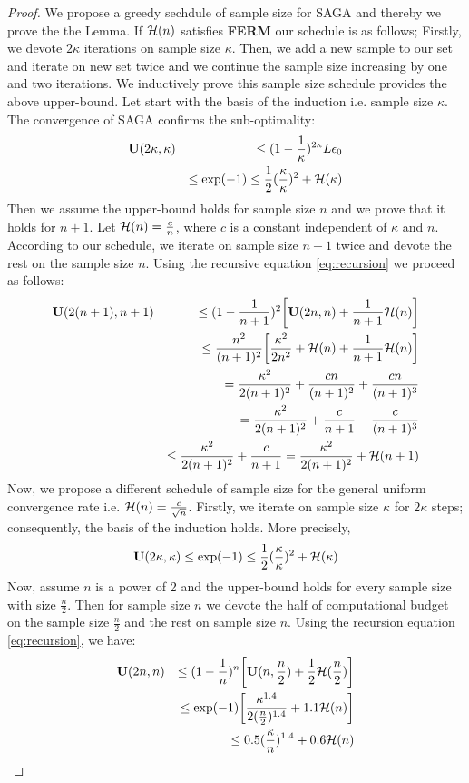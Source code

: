 \documentclass{article}
\begin{document}
\begin{proof}
	We propose a greedy sechdule of sample size for SAGA and thereby we prove the
	the Lemma. If ${\cal H}(n)$ satisfies \textbf{FERM} our schedule is as follows;
	Firstly, we devote $2 \kappa$ iterations on sample size $\kappa$. Then, we
	add a new sample to our set and iterate on new set twice and we continue the
	sample size increasing by one and two iterations. We inductively prove this
	sample size schedule provides the above upper-bound. Let start with the basis
	of the induction i.e. sample size $\kappa$. The convergence of SAGA confirms
	the sub-optimality: 
	\begin{eqnarray*}
		& \mathbf U(2\kappa,\kappa) & \leq (1-\frac{1}{\kappa})^{2\kappa} L \epsilon_0 \\
		& & \leq \exp(-1) \leq \frac{1}{2}(\frac{\kappa}{\kappa})^2 + {\cal H}(\kappa)
	\end{eqnarray*}
	Then we assume the upper-bound holds for sample size $n$ and we prove that it
	holds for $n+1$. Let ${\cal H}(n) = \frac{c}{n}$, where $c$ is a constant
	independent of $\kappa$ and $n$. According to our schedule, we iterate on
	sample size $n+1$ twice and devote the rest on the sample size $n$. 
	Using the recursive equation \ref{eq:recursion} we proceed as follows:
	\begin{eqnarray*}
		& \mathbf U(2(n+1),n+1) & \leq (1-\frac{1}{n+1})^2 \bigg[ \mathbf U(2n,n) + \frac{1}{n+1}
		{\cal H}(n) \bigg] \\
		& & \leq \frac{n^2}{(n+1)^2} \bigg[ \frac{\kappa^2}{2 n^2} + {\cal H}(n)
		+ \frac{1}{n+1} {\cal H}(n) \bigg]
		\\
		& & = \frac{\kappa^2}{2 (n+1)^2} + \frac{c n}{(n+1)^2} + \frac{c n}{(n+1)^3}
		\\
		& & = \frac{\kappa^2}{2 (n+1)^2} + \frac{c}{n+1} -\frac{c}{(n+1)^3} \\
		& & \leq \frac{\kappa^2}{2 (n+1)^2} + \frac{c}{n+1} = \frac{\kappa^2}{2
		(n+1)^2} + {\cal H}(n+1)
	\end{eqnarray*}
	Now, we propose a different schedule of sample size for the general uniform
	convergence rate i.e. ${\cal H}(n) = \frac{c}{\sqrt{n}}$. Firstly, we iterate on
	sample size $\kappa$ for $2 \kappa$ steps; consequently, the basis of the induction
	holds. More precisely,
	\begin{equation*}
		\mathbf U(2\kappa,\kappa)  \leq \exp(-1) \leq \frac{1}{2} (\frac{\kappa}{\kappa})^2 +
		{\cal H}(\kappa)
	\end{equation*}
	Now, assume $n$ is a power of 2 and the upper-bound holds for every
	sample size with size $\frac{n}{2}$. Then for sample size $n$ we devote the
	half of computational budget on the sample size $\frac{n}{2}$ and the rest on
	sample size $n$. Using the recursion equation \ref{eq:recursion}, we have: 
	\begin{eqnarray*}
		& \mathbf U(2n,n) & \leq (1-\frac{1}{n})^{n} \bigg[ \mathbf U(n,\frac{n}{2}) + \frac{1}{2}
		{\cal H}(\frac{n}{2}) \bigg] \\
		& & \leq \exp(-1) \bigg[ \frac{\kappa^{1.4}}{2 (\frac{n}{2})^{1.4}} 
		+ 1.1 {\cal H}(n) \bigg]
		\\
		& & \leq  0.5 (\frac{\kappa}{n})^{1.4} + 0.6 {\cal H}(n)
	\end{eqnarray*}
\end{proof}
\end{document}
